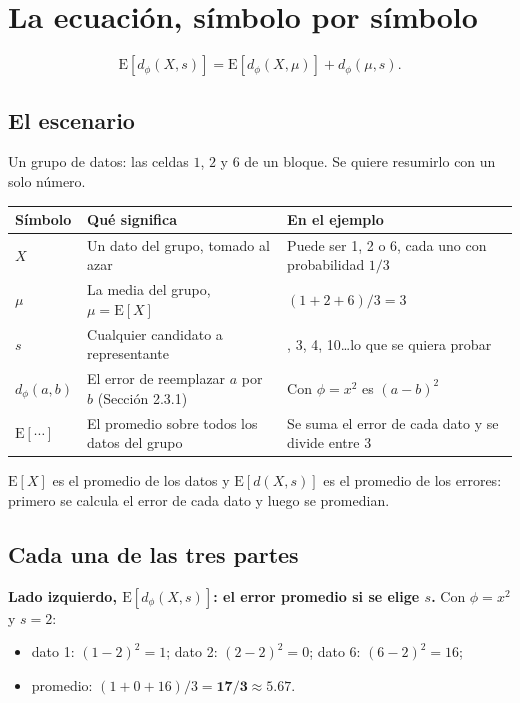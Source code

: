 \documentclass[11pt,a4paper]{article}
\begin{document}
\section{La ecuación, símbolo por símbolo}

\[
  \mathrm{E}[d_\phi(X,s)]=\mathrm{E}[d_\phi(X,\mu)]+d_\phi(\mu,s).
\]

\subsection{El escenario}

Un grupo de datos: las celdas $1$, $2$ y $6$ de un bloque. Se quiere resumirlo con
un solo número.

\begin{center}
\renewcommand{\arraystretch}{1.3}
\begin{tabular}{@{}>{\raggedright\arraybackslash}p{2.6cm}>{\raggedright\arraybackslash}p{6.4cm}>{\raggedright\arraybackslash}p{5.2cm}@{}}
\toprule
\textbf{Símbolo} & \textbf{Qué significa} & \textbf{En el ejemplo} \\
\midrule
$X$ & Un dato del grupo, tomado al azar & Puede ser 1, 2 o 6, cada uno con probabilidad $1/3$ \\
\midrule
$\mu$ & La media del grupo, $\mu=\mathrm{E}[X]$ & $(1+2+6)/3=3$ \\
\midrule
$s$ & Cualquier candidato a representante & 2, 3, 4, 10\dots lo que se quiera probar \\
\midrule
$d_\phi(a,b)$ & El error de reemplazar $a$ por $b$ (Sección 2.3.1) & Con $\phi=x^2$ es $(a-b)^2$ \\
\midrule
$\mathrm{E}[\cdots]$ & El promedio sobre todos los datos del grupo & Se suma el error de cada dato y se divide entre 3 \\
\bottomrule
\end{tabular}
\end{center}
$\mathrm{E}[X]$ es el promedio de los datos y $\mathrm{E}[d(X,s)]$ es el promedio de
los errores: primero se calcula el error de cada dato y luego se promedian.

\subsection{Cada una de las tres partes}

\textbf{Lado izquierdo, $\mathrm{E}[d_\phi(X,s)]$: el error promedio si se elige
$s$.} Con $\phi=x^2$ y $s=2$:
\begin{itemize}
  \item dato 1: $(1-2)^2=1$; dato 2: $(2-2)^2=0$; dato 6: $(6-2)^2=16$;
  \item promedio: $(1+0+16)/3=\mathbf{17/3\approx 5.67}$.
\end{itemize}
\end{document}
